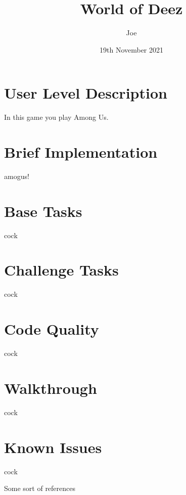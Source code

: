 \documentclass{article}
\title{World of Deez}
\author{Joe}
\date{19th November 2021}
\begin{document}
\maketitle

    \begin{multicols}{2}
        \section{User Level Description}
        In this game you play Among Us.

        \section{Brief Implementation}
        amogus!

        \section{Base Tasks}
        cock

        \section{Challenge Tasks}
        cock

        \section{Code Quality}
        cock

        \section{Walkthrough}
        cock

        \section{Known Issues}
        cock
    \end{multicols}

    \begin{thebibliography}{9}
        Some sort of references
    \end{thebibliography}        
\end{document}
